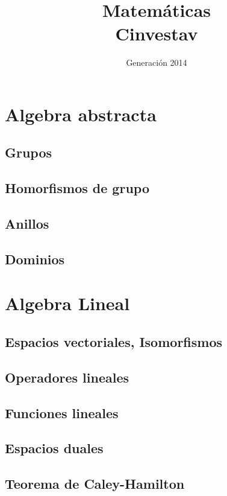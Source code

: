 \documentclass{tufte-book}
\title{Matemáticas \\ Cinvestav}
\author{Generación 2014}
\numberwithin{equation}{chapter}
\begin{document}
  \maketitle
  \tableofcontents
  \part{Algebra abstracta}
    \chapter{Grupos}
      
      
      
      
    \chapter{Homorfismos de grupo}
      
    \chapter{Anillos}
    \chapter{Dominios}
  \part{Algebra Lineal}
    \chapter{Espacios vectoriales, Isomorfismos}
    \chapter{Operadores lineales}
    \chapter{Funciones lineales}
    \chapter{Espacios duales}
    \chapter{Teorema de Caley-Hamilton}
\end{document}
